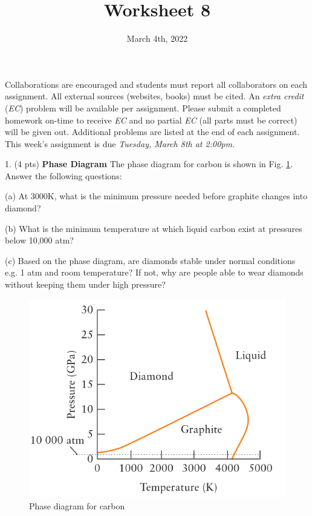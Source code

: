 \documentclass[11pt]{article}
\title{\textbf{Worksheet 8}}
\date{\vspace{-2em}March 4th, 2022}
\begin{document}
\maketitle

Collaborations are encouraged and students must report all collaborators
on each assignment. All external sources (websites, books) must be
cited. An \textit{extra credit} (\textit{EC}) problem will be available per
assignment. Please submit a completed homework on-time to receive \textit{EC}
and no partial \textit{EC} (all parts must be correct) will be given out.
Additional problems are listed at the end of each assignment. This week's
assignment is due \textit{Tuesday, March 8th at 2:00pm.}

1. (4 pts) \textbf{Phase Diagram} The phase diagram for carbon is shown in Fig. \ref{fig:carb}.
Answer the following questions:

(a) At 3000K, what is the minimum pressure needed before graphite changes into
diamond?

(b) What is the minimum temperature at which liquid carbon exist at pressures
below 10,000 atm?

(c) Based on the phase diagram, are diamonds stable under normal conditions e.g.
1 atm and room temperature? If not, why are people able to wear diamonds without
keeping them under high pressure?

\begin{figure}[hbpt]
  \centering
  \includegraphics[scale=0.4]{carbon.png}
  \caption{Phase diagram for carbon}
  \label{fig:carb}
\end{figure}
\end{document}
